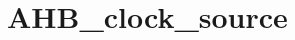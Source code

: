 \hypertarget{group___a_h_b__clock__source}{\section{A\-H\-B\-\_\-clock\-\_\-source}
\label{group___a_h_b__clock__source}
}

